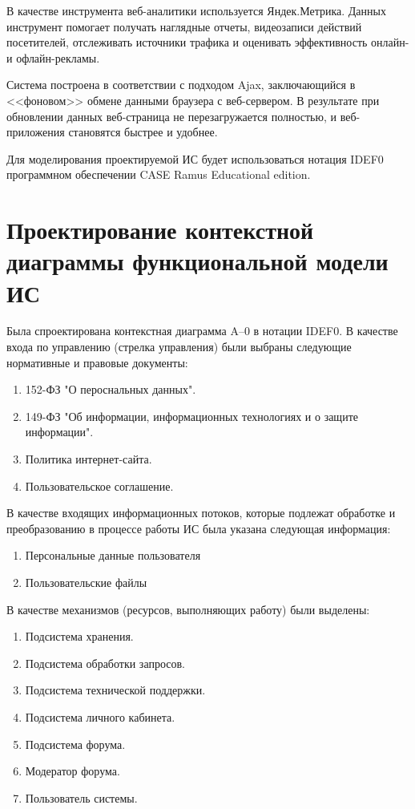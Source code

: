 \documentclass[a4paper,14pt]{extarticle}
\begin{document}
В качестве инструмента веб-аналитики используется Яндек.Метрика. Данных инструмент помогает получать наглядные отчеты, видеозаписи действий посетителей, отслеживать источники трафика и оценивать эффективность онлайн- и офлайн-рекламы.

Система построена в соответствии с подходом Ajax, заключающийся в <<фоновом>> обмене данными браузера с веб-сервером. В результате при обновлении данных веб-страница не перезагружается полностью, и веб-приложения становятся быстрее и удобнее.

Для моделирования проектируемой ИС будет
использоваться нотация IDEF0 программном обеспечении CASE Ramus
Educational edition.

\section{Проектирование контекстной диаграммы функциональной модели	ИС}

Была спроектирована контекстная диаграмма A–0 в нотации IDEF0.
В качестве входа по управлению (стрелка управления) были выбраны
следующие нормативные и правовые документы:

\begin{enumerate}
	\item 152-ФЗ "О пероснальных данных".
	\item 149-ФЗ "Об информации, информационных технологиях и о защите информации".
	\item Политика интернет-сайта.
	\item Пользовательское соглашение.
\end{enumerate}

В качестве входящих информационных потоков, которые подлежат
обработке и преобразованию в процессе работы ИС была указана следующая
информация:
\begin{enumerate}
	\item Персональные данные пользователя
	\item Пользовательские файлы
\end{enumerate}

В качестве механизмов (ресурсов, выполняющих работу) были
выделены:
\begin{enumerate}
\item Подсистема хранения.
\item Подсистема обработки запросов.
\item Подсистема технической поддержки.
\item Подсистема личного кабинета.
\item Подсистема форума.
\item Модератор форума.
\item Пользователь системы.
\end{enumerate}
\end{document}
